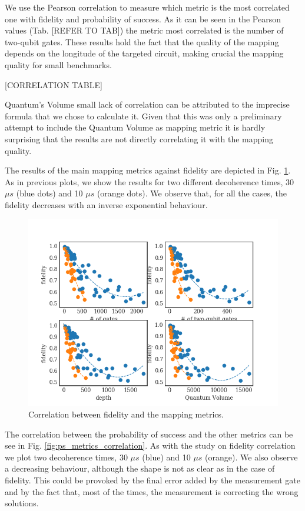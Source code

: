 We use the Pearson correlation to measure which metric is the most correlated one with fidelity and probability of success.
As it can be seen in the Pearson values (Tab. [REFER TO TAB]) the metric most correlated is the number of two-qubit gates.
These results hold the fact that the quality of the mapping depends on the longitude of the targeted circuit, making crucial the mapping quality for small benchmarks.

[CORRELATION TABLE]

Quantum's Volume small lack of correlation can be attributed to the imprecise formula that we chose to calculate it.
Given that this was only a preliminary attempt to include the Quantum Volume as mapping metric it is hardly surprising that the results are not directly correlating it with the mapping quality.

The results of the main mapping metrics against fidelity are depicted in Fig. \ref{fig:f_metrics_correlation}.
As in previous plots, we show the results for two different decoherence times, 30 \(\mu s\) (blue dots) and 10 \(\mu s\) (orange dots).
We observe that, for all the cases, the fidelity decreases with an inverse exponential behaviour.

\begin{figure}[htbp]
\centering
\includegraphics[width=\textwidth]{figures/f_metrics_correlation.png}
\caption{\label{fig:f_metrics_correlation}
Correlation between fidelity and the mapping metrics.}
\end{figure}

The correlation between the probability of success and the other metrics can be see in Fig. \ref{fig:ps_metrics_correlation}.
As with the study on fidelity correlation we plot two decoherence times, 30 \(\mu s\) (blue) and 10 \(\mu s\) (orange).
We also observe a decreasing behaviour, although the shape is not as clear as in the case of fidelity.
This could be provoked by the final error added by the measurement gate and by the fact that, most of the times, the measurement is correcting the wrong solutions.

